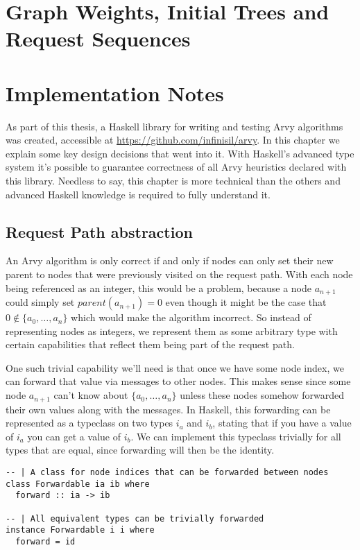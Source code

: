 \documentclass[a4paper, oneside]{discothesis}
\begin{document}
\chapter{Graph Weights, Initial Trees and Request Sequences}

\chapter{Implementation Notes}

As part of this thesis, a Haskell library for writing and testing Arvy algorithms was created, accessible at \url{https://github.com/infinisil/arvy}. In this chapter we explain some key design decisions that went into it. With Haskell's advanced type system it's possible to guarantee correctness of all Arvy heuristics declared with this library. Needless to say, this chapter is more technical than the others and advanced Haskell knowledge is required to fully understand it.

\section{Request Path abstraction}

An Arvy algorithm is only correct if and only if nodes can only set their new parent to nodes that were previously visited on the request path. With each node being referenced as an integer, this would be a problem, because a node $a_{n+1}$ could simply set $parent(a_{n+1})=0$ even though it might be the case that $0\notin\{a_0,\dots,a_n\}$ which would make the algorithm incorrect. So instead of representing nodes as integers, we represent them as some arbitrary type with certain capabilities that reflect them being part of the request path.

One such trivial capability we'll need is that once we have some node index, we can forward that value via messages to other nodes. This makes sense since some node $a_{n+1}$ can't know about $\{a_0,\dots,a_n\}$ unless these nodes somehow forwarded their own values along with the messages. In Haskell, this forwarding can be represented as a typeclass on two types $i_a$ and $i_b$, stating that if you have a value of $i_a$ you can get a value of $i_b$. We can implement this typeclass trivially for all types that are equal, since forwarding will then be the identity.

\begin{verbatim}
-- | A class for node indices that can be forwarded between nodes
class Forwardable ia ib where
  forward :: ia -> ib

-- | All equivalent types can be trivially forwarded
instance Forwardable i i where
  forward = id
\end{verbatim}
\end{document}
